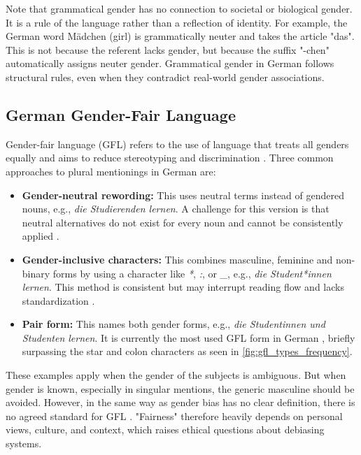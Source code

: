         Note that grammatical gender has no connection to societal or biological gender. It is a rule of the language rather than a reflection of identity. For example, the German word Mädchen (girl) is grammatically neuter and takes the article "das". This is not because the referent lacks gender, but because the suffix "-chen" automatically assigns neuter gender. Grammatical gender in German follows structural rules, even when they contradict real-world gender associations.

    \subsection{German Gender-Fair Language} \label{subsection:german_gfl}
    Gender-fair language (GFL) refers to the use of language that treats all genders equally and aims to reduce stereotyping and discrimination \parencite{sczesnyCanGenderFairLanguage2016}. Three common approaches to plural mentionings in German are: 

    \begin{itemize}
        \item \textbf{Gender-neutral rewording:}  
        This uses neutral terms instead of gendered nouns, e.g., \textit{die Studierenden lernen}. A challenge for this version is that neutral alternatives do not exist for every noun and cannot be consistently applied \parencite{lardelliBuildingBridgesDataset2024}.

        \item \textbf{Gender-inclusive characters:}  
        This combines masculine, feminine and non-binary forms by using a character like \textit{*}, \textit{:}, or \textit{\_}, e.g., \textit{die Student*innen lernen}. This method is consistent but may interrupt reading flow and lacks standardization \parencite{lardelliBuildingBridgesDataset2024}.

        \item \textbf{Pair form:}  
        This names both gender forms, e.g., \textit{die Studentinnen und Studenten lernen}. It is currently the most used GFL form in German \parencite{waldendorfWordsChangeIncrease2024}, briefly surpassing the star and colon characters as seen in \autoref{fig:gfl_types_frequency}.
    \end{itemize}

    These examples apply when the gender of the subjects is ambiguous. But when gender is known, especially in singular mentions, the generic masculine should be avoided. However, in the same way as gender bias has no clear definition, there is no agreed standard for GFL \parencite{lardelliBuildingBridgesDataset2024, savoldiDecadeGenderBias2025}. "Fairness" therefore heavily depends on personal views, culture, and context, which raises ethical questions about debiasing systems.

